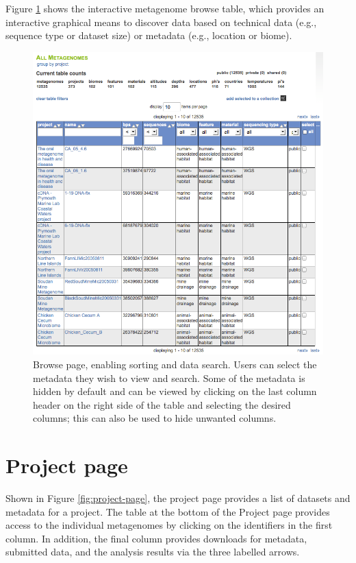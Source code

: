 \documentclass[12pt,fullpage]{report}
\begin{document}
Figure \ref{fig:metagenome-browser} shows the interactive metagenome browse table, which provides an interactive graphical means to discover data based on technical data (e.g., sequence type or dataset size) or metadata (e.g., location or biome).

\begin{figure}
\begin{center}
\includegraphics[width=6in]{Images/metagenome-browser.png}
\end{center}
\caption{
Browse page, enabling sorting and data search. Users can select the metadata they wish to view and search. Some of the metadata is hidden by default and can be viewed by clicking on the last column header on the right side of the table and selecting the desired columns; this can also be used to hide unwanted columns.
}
\label{fig:metagenome-browser}
\end{figure}
\section{Project page}
Shown in Figure \ref{fig:project-page}, the project page provides a list of datasets and metadata for a project.
The table at the bottom of the Project page provides access to the individual metagenomes by clicking on the identifiers in the first column. In addition, the final column provides downloads for metadata, submitted data, and the analysis results via the three labelled arrows.
\end{document}
